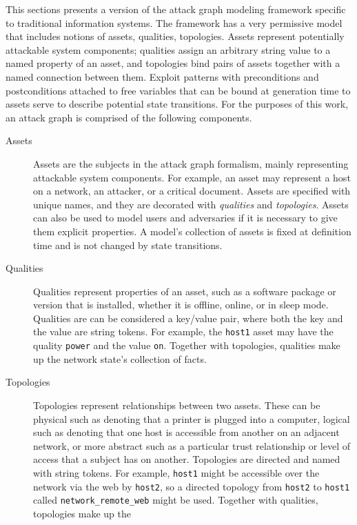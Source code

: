 This sections presents a version of the attack graph modeling framework specific
to traditional information systems. The framework has a very permissive model that
includes notions of assets, qualities, topologies. Assets represent potentially
attackable system components; qualities assign an arbitrary string value to a named
property of an asset, and topologies bind pairs of assets together with a named
connection between them. Exploit patterns with preconditions and postconditions attached
to free variables that can be bound at generation time to assets serve to describe potential
state transitions.
For the purposes of this work, an attack graph is comprised of the following components.
\begin{description}
	\item[Assets] Assets are the subjects in the attack graph formalism, mainly representing
		attackable system components. For example, an asset may represent a host
        on a network, an attacker, or a critical document. Assets are specified
		with unique names, and they are decorated with \emph{qualities} and \emph{topologies}.
		Assets can also be used to model users and adversaries if it is necessary to give them
		explicit properties. A model's collection of assets is fixed at definition time and
		is not changed by state transitions.
	\item[Qualities] Qualities represent properties of an asset, such as a software package or
		version that is installed, whether it is offline, online, or in sleep mode. Qualities are
		can be considered a key/value pair, where both the key and the value are string tokens. For
		example, the \texttt{host1} asset may have the quality \texttt{power} and the value \texttt{on}.
		Together with topologies, qualities make up the network state's collection of facts.
	\item[Topologies] Topologies represent relationships between two assets. These can be physical such
		as denoting that a printer is plugged into a computer, logical such as denoting that one
		host is accessible from another on an adjacent network, or more abstract such as a particular
		trust relationship or level of access that a subject has on another. Topologies are directed and
		named with string tokens. For example, \texttt{host1} might be accessible over the network via the
		web by \texttt{host2}, so a directed topology from \texttt{host2} to \texttt{host1} called
		\texttt{network\_remote\_web} might be used. Together with qualities, topologies make up the

\end{description}
